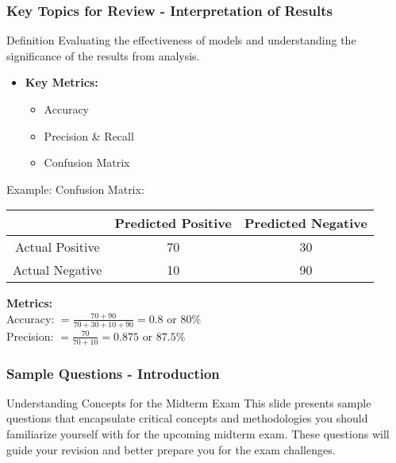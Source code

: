 \documentclass{beamer}
\begin{document}
\begin{frame}[fragile]
    \frametitle{Key Topics for Review - Interpretation of Results}
    \begin{block}{Definition}
        Evaluating the effectiveness of models and understanding the significance of the results from analysis.
    \end{block}
    
    \begin{itemize}
        \item \textbf{Key Metrics:}
            \begin{itemize}
                \item Accuracy
                \item Precision \& Recall
                \item Confusion Matrix
            \end{itemize}
    \end{itemize}

    \begin{block}{Example:}
        Confusion Matrix:
        \begin{center}
        \begin{tabular}{|c|c|c|}
        \hline
                        & Predicted Positive & Predicted Negative \\
        \hline
        Actual Positive & 70                  & 30                  \\
        Actual Negative & 10                  & 90                  \\
        \hline
        \end{tabular}
        \end{center}
        
        \textbf{Metrics:} \\
        Accuracy:  
        \( = \frac{70 + 90}{70 + 30 + 10 + 90} = 0.8 \text{ or } 80\% \) \\
        Precision: 
        \( = \frac{70}{70 + 10} = 0.875 \text{ or } 87.5\% \)
    \end{block}
\end{frame}

\begin{frame}[fragile]
    \frametitle{Sample Questions - Introduction}
    \begin{block}{Understanding Concepts for the Midterm Exam}
        This slide presents sample questions that encapsulate critical concepts and methodologies you should familiarize yourself with for the upcoming midterm exam. 
        These questions will guide your revision and better prepare you for the exam challenges.
    \end{block}
\end{frame}
\end{document}
